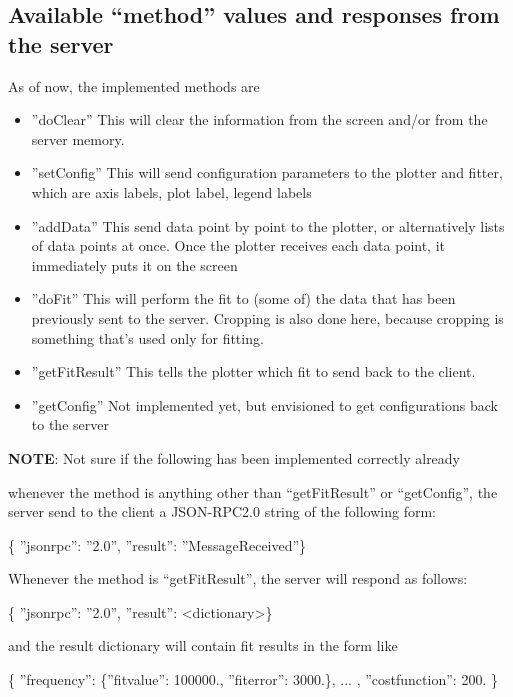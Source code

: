 \documentclass[11pt]{article} %
\begin{document}
\subsection{Available ``method'' values and responses from the server}

As of now, the implemented methods are 
\begin{itemize}
\item { {''}doClear{''}} This will clear the information from the screen and/or from the server memory. 
\item { {''}setConfig{''}} This will send configuration parameters to the plotter and fitter, which are axis labels, plot label, legend labels
\item { {''}addData{''}} This send data point by point to the plotter, or alternatively lists of data points at once. Once the plotter receives each data point, it immediately puts it on the screen
\item { {''}doFit{''}} This will perform the fit to (some of) the data that has been previously sent to the server. Cropping is also done here, because cropping is something that's used only for fitting. 
\item { {''}getFitResult{''}} This tells the plotter which fit to send back to the client. 
\item { {''}getConfig{''}} Not implemented yet, but envisioned to get configurations back to the server
\end{itemize}

\textbf{NOTE}: Not sure if the following has been implemented correctly already

whenever the method is anything other than ``getFitResult'' or ``getConfig'', the server send to the client a JSON-RPC2.0 string of the following form: 

{ \{ {''}jsonrpc{''}: {''}2.0{''}, {''}result{''}: {''}MessageReceived{''}\}}

Whenever the method is ``getFitResult'', the server will respond as follows: 

{ \{ {''}jsonrpc{''}: {''}2.0{''}, {''}result{''}: <dictionary>\}}

and the result dictionary will contain fit results in the form like 

{ \{ {''}frequency{''}: \{{''}fitvalue{''}: 100000., {''}fiterror{''}: 3000.\}, ... , {''}costfunction{''}: 200. \}}
\end{document}
